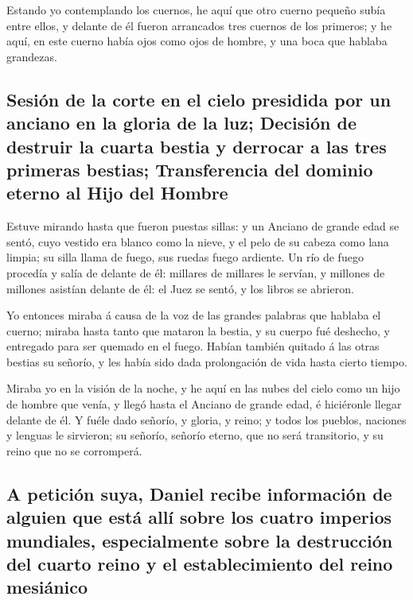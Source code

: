  Estando yo contemplando los cuernos, he aquí que otro
cuerno pequeño subía entre ellos, y delante de él fueron arrancados tres
cuernos de los primeros; y he aquí, en este cuerno había ojos como ojos
de hombre, y una boca que hablaba grandezas.

\hypertarget{sesiuxf3n-de-la-corte-en-el-cielo-presidida-por-un-anciano-en-la-gloria-de-la-luz-decisiuxf3n-de-destruir-la-cuarta-bestia-y-derrocar-a-las-tres-primeras-bestias-transferencia-del-dominio-eterno-al-hijo-del-hombre}{%
\subsection{Sesión de la corte en el cielo presidida por un anciano en
la gloria de la luz; Decisión de destruir la cuarta bestia y derrocar a
las tres primeras bestias; Transferencia del dominio eterno al Hijo del
Hombre}\label{sesiuxf3n-de-la-corte-en-el-cielo-presidida-por-un-anciano-en-la-gloria-de-la-luz-decisiuxf3n-de-destruir-la-cuarta-bestia-y-derrocar-a-las-tres-primeras-bestias-transferencia-del-dominio-eterno-al-hijo-del-hombre}}

 Estuve mirando hasta que fueron puestas sillas: y un
Anciano de grande edad se sentó, cuyo vestido era blanco como la nieve,
y el pelo de su cabeza como lana limpia; su silla llama de fuego, sus
ruedas fuego ardiente.  Un río de fuego procedía y salía de
delante de él: millares de millares le servían, y millones de millones
asistían delante de él: el Juez se sentó, y los libros se abrieron.

 Yo entonces miraba á causa de la voz de las grandes
palabras que hablaba el cuerno; miraba hasta tanto que mataron la
bestia, y su cuerpo fué deshecho, y entregado para ser quemado en el
fuego.  Habían también quitado á las otras bestias su
señorío, y les había sido dada prolongación de vida hasta cierto tiempo.

 Miraba yo en la visión de la noche, y he aquí en las nubes
del cielo como un hijo de hombre que venía, y llegó hasta el Anciano de
grande edad, é hiciéronle llegar delante de él.  Y fuéle
dado señorío, y gloria, y reino; y todos los pueblos, naciones y lenguas
le sirvieron; su señorío, señorío eterno, que no será transitorio, y su
reino que no se corromperá.

\hypertarget{a-peticiuxf3n-suya-daniel-recibe-informaciuxf3n-de-alguien-que-estuxe1-alluxed-sobre-los-cuatro-imperios-mundiales-especialmente-sobre-la-destrucciuxf3n-del-cuarto-reino-y-el-establecimiento-del-reino-mesiuxe1nico}{%
\subsection{A petición suya, Daniel recibe información de alguien que
está allí sobre los cuatro imperios mundiales, especialmente sobre la
destrucción del cuarto reino y el establecimiento del reino
mesiánico}\label{a-peticiuxf3n-suya-daniel-recibe-informaciuxf3n-de-alguien-que-estuxe1-alluxed-sobre-los-cuatro-imperios-mundiales-especialmente-sobre-la-destrucciuxf3n-del-cuarto-reino-y-el-establecimiento-del-reino-mesiuxe1nico}}

